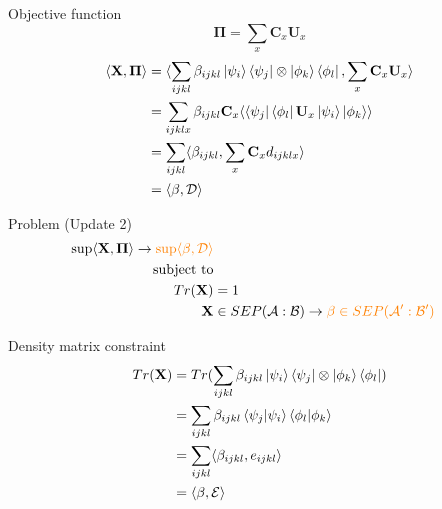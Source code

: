\documentclass{beamer}
\begin{document}
        \begin{frame}{Objective function}
            $$
                \mathbf{\Pi} = \sum\limits_{x}\mathbf{C}_{x}\mathbf{U}_{x}
            $$
            \begin{align*}
                \langle\mathbf{X}, \mathbf{\Pi}\rangle &= \langle\sum\limits_{ijkl}\beta_{ijkl}\ket{\psi_{i}}\bra{\psi_{j}}\otimes\ket{\phi_{k}}\bra{\phi_{l}}, \sum\limits_{x}\mathbf{C}_{x}\mathbf{U}_{x}\rangle \\
                &= \sum\limits_{ijklx}\beta_{ijkl}\mathbf{C}_{x}\langle\bra{\psi_{j}}\bra{\phi_{l}}\mathbf{U}_{x}\ket{\psi_{i}}\ket{\phi_{k}}\rangle \\
                &= \sum\limits_{ijkl}\langle\beta_{ijkl}, \sum\limits_{x}\mathbf{C}_{x}d_{ijklx}\rangle \\
                &= \langle\mathbf{\beta}, \mathcal{D}\rangle
            \end{align*}
        \end{frame}
        
        \begin{frame}{Problem (Update 2)}
            \begin{align*}
                \sup\langle\mathbf{X}, \mathbf{\Pi}\rangle \rightarrow \textcolor{orange}{\sup\langle\mathbf{\beta}, \mathcal{D}\rangle} \\
                \mbox{subject to} \\
                Tr(\mathbf{X}) &= 1 \\
                \mathbf{X} &\in SEP(\mathcal{A}:\mathcal{B}) \rightarrow \textcolor{orange}{\mathbf{\beta} \in SEP(\mathcal{A}':\mathcal{B}')}
            \end{align*}
        \end{frame}

        \begin{frame}{Density matrix constraint}
            \begin{align*}
                Tr(\mathbf{X}) &= Tr(\sum\limits_{ijkl}\beta_{ijkl}\ket{\psi_{i}}\bra{\psi_{j}}\otimes\ket{\phi_{k}}\bra{\phi_{l}}) \\
                &= \sum\limits_{ijkl}\beta_{ijkl}\braket{\psi_{j}}{\psi_{i}}\braket{\phi_{l}}{\phi_{k}} \\
                &= \sum\limits_{ijkl}\langle\beta_{ijkl}, e_{ijkl}\rangle \\
                &= \langle\mathbf{\beta}, \mathcal{E}\rangle
            \end{align*}
        \end{frame}
\end{document}

